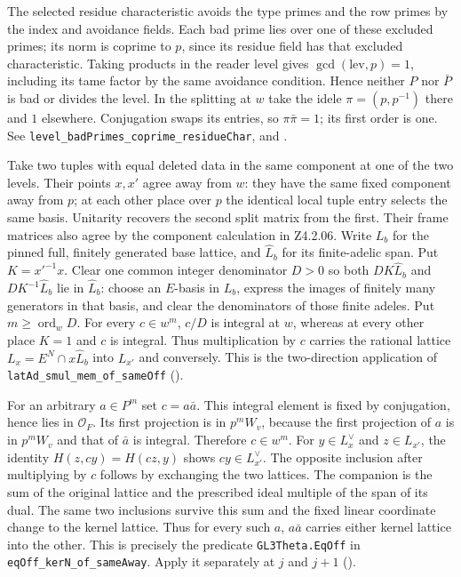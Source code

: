 The selected residue characteristic avoids the type primes and the row
primes by the index and avoidance fields. Each bad prime lies over one of
these excluded primes; its norm is coprime to \(p\), since its residue
field has that excluded characteristic. Taking products in the reader
level gives \(\gcd(\mathrm{lev},p)=1\), including its tame factor
by the same avoidance condition. Hence neither \(P\) nor \(\bar P\)
is bad or divides the level. In the splitting at \(w\) take the idele
\(\pi=(p,p^{-1})\) there and \(1\) elsewhere. Conjugation swaps its
entries, so \(\pi\bar\pi=1\); its first order is one. See
\nolinkurl{level_badPrimes_coprime_residueChar},
and .

Take two tuples with equal deleted data in the same component at one
of the two levels. Their points \(x,x'\) agree away from \(w\):
they have the same fixed component away from \(p\); at each other place
over \(p\) the identical local tuple entry selects the same basis.
Unitarity recovers the second split matrix from the first. Their frame
matrices also agree by the component calculation in Z4.2.06.
Write \(L_b\) for the pinned full, finitely generated base lattice,
and \(\widehat L_b\) for its finite-adelic span. Put \(K=x'^{-1}x\).
Clear one common integer denominator \(D>0\) so both
\(DK\widehat L_b\) and \(DK^{-1}\widehat L_b\) lie in
\(\widehat L_b\): choose an \(E\)-basis in \(L_b\), express the
images of finitely many generators in that basis, and clear the
denominators of those finite adeles. Put \(m\ge\operatorname{ord}_w D\).
For every \(c\in w^m\), \(c/D\) is integral at \(w\), whereas
at every other place \(K=1\) and \(c\) is integral. Thus multiplication
by \(c\) carries the rational lattice
\(L_x=E^N\cap x\widehat L_b\) into \(L_{x'}\) and conversely.
This is the two-direction application of
\nolinkurl{latAd_smul_mem_of_sameOff}
().

For an arbitrary \(a\in P^m\) set \(c=a\bar a\). This integral element
is fixed by conjugation, hence lies in \(\mathcal O_F\).
Its first projection is in \(p^mW_v\), because the first projection of
\(a\) is in \(p^mW_v\) and that of \(\bar a\) is integral.
Therefore \(c\in w^m\). For \(y\in L_x^\vee\) and \(z\in L_{x'}\),
the identity \(H(z,cy)=H(cz,y)\) shows \(cy\in L_{x'}^\vee\).
The opposite inclusion after multiplying by \(c\) follows by exchanging
the two lattices. The companion is the sum of the original lattice
and the prescribed ideal multiple of the span of its dual.
The same two inclusions survive this sum and the fixed linear
coordinate change to the kernel lattice. Thus for every such \(a\),
\(a\bar a\) carries either kernel lattice into the other. This is
precisely the predicate \nolinkurl{GL3Theta.EqOff} in \nolinkurl{eqOff_kerN_of_sameAway}. Apply it separately at \(j\) and
\(j+1\) ().

